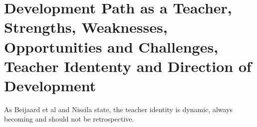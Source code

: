 \section{ Development Path as a Teacher, Strengths, Weaknesses, Opportunities and Challenges, Teacher Idententy and Direction of Development}

As Beijaard et al \cite{Beijaard_2004} and Nissila \cite{nissila_2013} state, the teacher identity is dynamic, always becoming and should not be retrospective. 

  
  
